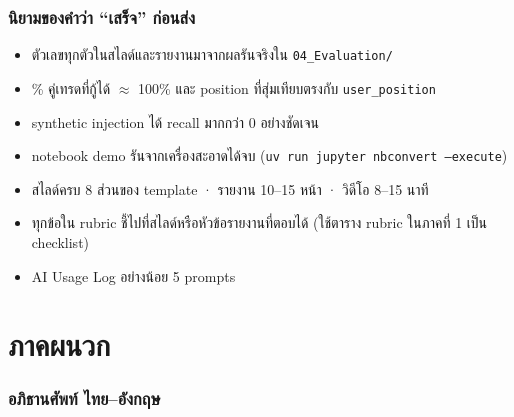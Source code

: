\documentclass[11pt,a4paper]{article}
\newcommand{\code}[1]{\texttt{#1}}
\begin{document}
\section{นิยามของคำว่า ``เสร็จ'' ก่อนส่ง}

\begin{itemize}
\item[$\square$] ตัวเลขทุกตัวในสไลด์และรายงานมาจากผลรันจริงใน \code{04\_Evaluation/}
\item[$\square$] \% คู่เทรดที่กู้ได้ $\approx$ 100\% และ position ที่สุ่มเทียบตรงกับ \code{user\_position}
\item[$\square$] synthetic injection ได้ recall มากกว่า 0 อย่างชัดเจน
\item[$\square$] notebook demo รันจากเครื่องสะอาดได้จบ
      (\code{uv run jupyter nbconvert --execute})
\item[$\square$] สไลด์ครบ 8 ส่วนของ template · รายงาน 10--15 หน้า · วิดีโอ 8--15 นาที
\item[$\square$] ทุกข้อใน rubric ชี้ไปที่สไลด์หรือหัวข้อรายงานที่ตอบได้ (ใช้ตาราง rubric ในภาคที่ 1 เป็น checklist)
\item[$\square$] AI Usage Log อย่างน้อย 5 prompts
\end{itemize}

\clearpage
\appendix
\part*{ภาคผนวก}

\section{อภิธานศัพท์ ไทย--อังกฤษ}
\end{document}
